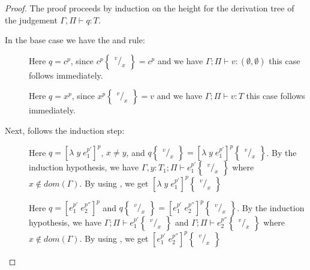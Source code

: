\documentclass[../../master.tex]{subfiles}
\begin{document}
\begin{proof}
	The proof proceeds by induction on the height for the derivation tree of the judgement $\Gamma,\Pi\vdash q:T$.
	
	In the base case we have the  and  rule:
	\begin{description}
		\item[] Here $q=c^p$, since $c^p\begin{Bmatrix} ^v/_x \end{Bmatrix}=c^p$ and we have $\Gamma;\Pi\vdash v:(\emptyset,\emptyset)$ this case follows immediately.

		\item[] Here $q=x^p$, since $x^p\begin{Bmatrix} ^v/_x \end{Bmatrix}=v$ and we have $\Gamma;\Pi\vdash v:T$ this case follows immediately.
	\end{description}

	Next, follows the induction step:
	\begin{description}
		\item[] Here $q=[\lambda\;y\;e_1^{p'}]^p$, $x\neq y$, and $q\begin{Bmatrix} ^v/_x \end{Bmatrix}=[\lambda\;y\;e_1^{p'}]^p\begin{Bmatrix} ^v/_x \end{Bmatrix}$.
			By the induction hypothesis, we have $\Gamma,y:T_1;\Pi\vdash e_1^{p'}\begin{Bmatrix} ^v/_x \end{Bmatrix}$ where $x\notin dom(\Gamma)$.
			By using , we get $[\lambda\;y\;e_1^{p'}]^p\begin{Bmatrix} ^v/_x \end{Bmatrix}$

		\item[] Here $q=[e_1^{p'}\;e_2^{p''}]^p$ and $q\begin{Bmatrix} ^v/_x \end{Bmatrix}=[e_1^{p'}\;e_2^{p''}]^p\begin{Bmatrix} ^v/_x \end{Bmatrix}$.
			By the induction hypothesis, we have $\Gamma;\Pi\vdash e_1^{p'}\begin{Bmatrix} ^v/_x \end{Bmatrix}$ and $\Gamma;\Pi\vdash e_2^{p''}\begin{Bmatrix} ^v/_x \end{Bmatrix}$ where $x\notin dom(\Gamma)$.
			By using , we get $[e_1^{p'}\;e_2^{p''}]^p\begin{Bmatrix} ^v/_x \end{Bmatrix}$


\end{description}
\end{proof}
\end{document}
